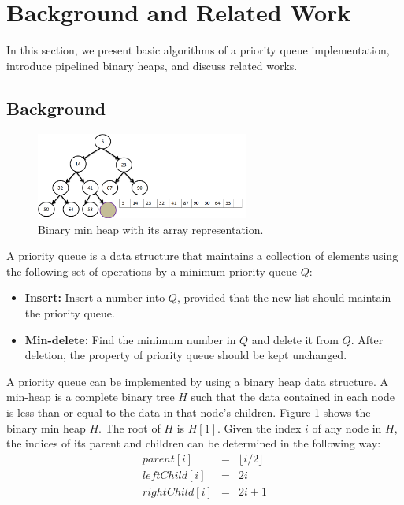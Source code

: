 \documentclass[10pt, conference, compsocconf]{IEEEtran}
\newtheorem{definition}{Definition}[section]
\begin{document}
\section{Background and Related Work}
In this section, we present basic algorithms of a priority queue implementation, introduce pipelined binary heaps, and discuss related works.

\subsection{Background}

\begin{figure}[!ht]
  \centering
  \includegraphics[width=7cm]{Figures/fig2.png}
      \caption{Binary min heap with its array representation.}
    \label{fig2}
\end{figure}

A priority queue is a data structure that maintains a collection of elements using the following set of operations by a minimum priority queue $Q$:
\begin{itemize}
\item {\bf Insert:} Insert a number into $Q$, provided that the new list should maintain the priority queue.

\item {\bf Min-delete:} Find the minimum number in $Q$ and delete it from $Q$. After deletion, the property of priority queue should be kept unchanged.
\end{itemize}

A priority queue can be implemented by using a binary heap data structure.
A min-heap is a complete binary tree $H$ such that the data contained in each node is less than or equal to the data in that node's children.
Figure \ref{fig2} shows the binary min heap $H$.
The root of $H$ is $H[1]$.
Given the index $i$ of any node in $H$, the indices of its parent and children can be determined in the following way:
\begin{eqnarray*}
parent[i] &=&  \lfloor i/2 \rfloor \\
leftChild[i] &=& 2i\\
rightChild[i] &=& 2i + 1
\end{eqnarray*}
\end{document}
